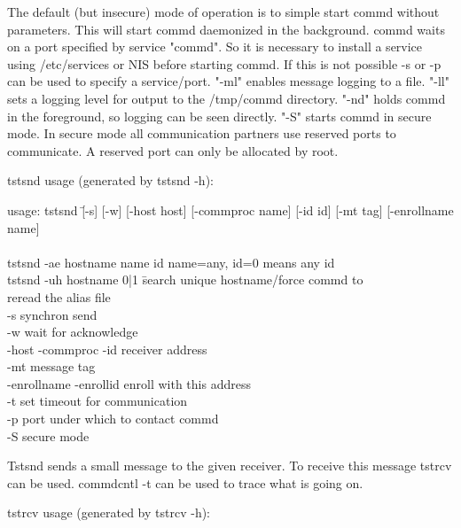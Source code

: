 The default (but insecure) mode of operation is to simple start commd without
parameters. This will start commd daemonized in the background. commd waits
on a port specified by service "commd". So it is necessary to install a service
using /etc/services or NIS before starting commd. If this is not possible -s or
-p can be used to specify a service/port. "-ml" enables message logging to a 
file. "-ll" sets a logging level for output to the /tmp/commd directory.
"-nd" holds commd in the foreground, so logging can be seen directly.
"-S" starts commd in secure mode. In secure mode all communication partners
use reserved ports to communicate. A reserved port can only be allocated by 
root.


tstsnd usage (generated by tstsnd -h): 

\begin{tabbing}
usage: tstsnd \=[-s] [-w] [-host host] [-commproc name] [-id id] [-mt tag] [-enrollname name] \\ 
\>	[-enrollid id] [-t timeout] [-p commdport] [-S]\\
tstsnd \>[-p commdport] -ae hostname name id   name=any, id=0 means any id\\
tstsnd \>[-p commdport] -uh hostname 0|1  \=search unique hostname/force commd to \\ 
\>                                        \>reread the alias file\\
\>	-s synchron send\\
\>      -w wait for acknowledge\\
\>	-host -commproc -id  receiver address\\
\>	-mt message tag\\
\>	-enrollname -enrollid  enroll with this address\\
\>	-t set timeout for communication\\
\>	-p port under which to contact commd\\
\>	-S secure mode\\
\end{tabbing}

Tstsnd sends a small message to the given receiver. To receive this message
tstrcv can be used. commdcntl -t can be used to trace what is going on.

tstrcv usage (generated by tstrcv -h): 

